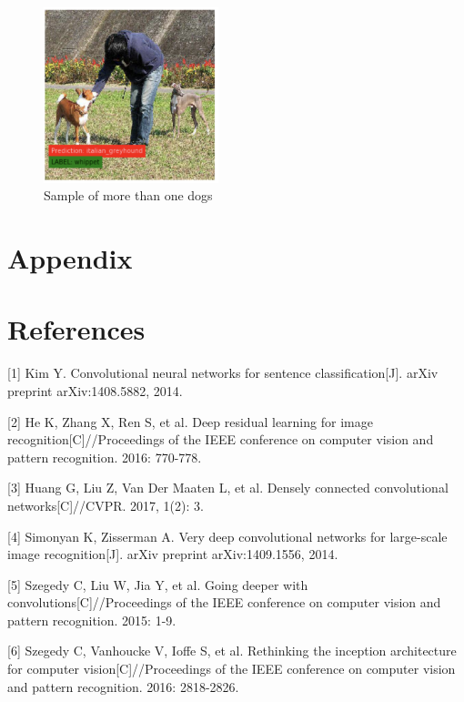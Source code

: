 \documentclass{article}
\begin{document}
\begin{figure}[H]
	\centering
	\includegraphics[width=2in]{pics/two_dogs} 
	\caption{Sample of more than one dogs}
\end{figure}


\section{Appendix}


\section*{References}

\medskip

\small

[1] Kim Y. Convolutional neural networks for sentence classification[J]. arXiv preprint arXiv:1408.5882, 2014.

[2] He K, Zhang X, Ren S, et al. Deep residual learning for image recognition[C]//Proceedings of the IEEE conference on computer vision and pattern recognition. 2016: 770-778.

[3] Huang G, Liu Z, Van Der Maaten L, et al. Densely connected convolutional networks[C]//CVPR. 2017, 1(2): 3.

[4] Simonyan K, Zisserman A. Very deep convolutional networks for large-scale image recognition[J]. arXiv preprint arXiv:1409.1556, 2014.

[5] Szegedy C, Liu W, Jia Y, et al. Going deeper with convolutions[C]//Proceedings of the IEEE conference on computer vision and pattern recognition. 2015: 1-9.

[6] Szegedy C, Vanhoucke V, Ioffe S, et al. Rethinking the inception architecture for computer vision[C]//Proceedings of the IEEE conference on computer vision and pattern recognition. 2016: 2818-2826.
\end{document}
